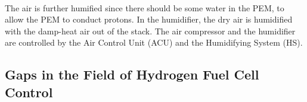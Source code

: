 \paragraph{}The air is further humified since there should be some water in the PEM, to allow the PEM to conduct protons. In the humidifier, the dry air is humidified with the damp-heat air out of the stack. The air compressor and the humidifier are controlled by the Air Control Unit (ACU) and the Humidifying System (HS).
\subsection{Gaps in the Field of Hydrogen Fuel Cell Control}


